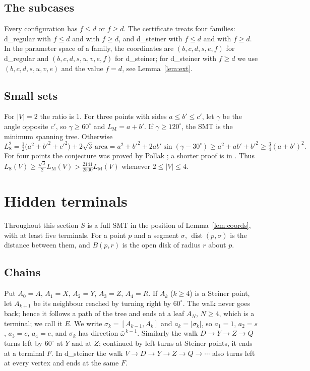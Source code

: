 \documentclass[11pt]{amsart}
\theoremstyle{definition}
\theoremstyle{remark}
\numberwithin{equation}{section}
\newcommand{\LS}{L_{\mathrm S}}
\newcommand{\LM}{L_{\mathrm M}}
\newcommand{\dist}{\operatorname{dist}}
\newcommand{\RHO}{\tfrac{2141}{2500}}
\begin{document}
\subsection{The subcases}
Every configuration has $f\le d$ or $f\ge d$. The certificate treats four families: d\_regular with $f\le d$ and with $f\ge d$, and d\_steiner with $f\le d$ and with $f\ge d$. In the parameter space of a family, the coordinates are $(b,c,d,s,e,f)$ for d\_regular and $(b,c,d,s,u,v,e,f)$ for d\_steiner; for d\_steiner with $f\ge d$ we use $(b,c,d,s,u,v,e)$ and the value $f=d$, see Lemma~\ref{lem:ext}.

\subsection{Small sets}\label{sec:small}
For $|V|=2$ the ratio is $1$. For three points with sides $a\le b'\le c'$, let $\gamma$ be the angle opposite $c'$, so $\gamma\ge60^\circ$ and $\LM=a+b'$. If $\gamma\ge120^\circ$, the SMT is the minimum spanning tree. Otherwise
\[
\LS^2=\tfrac12\bigl(a^2+b'^2+c'^2\bigr)+2\sqrt3\,\mathrm{area}=a^2+b'^2+2ab'\sin(\gamma-30^\circ)\ge a^2+ab'+b'^2\ge\tfrac34(a+b')^2.
\]
For four points the conjecture was proved by Pollak \cite{Pol78}; a shorter proof is in \cite{DYH82}. Thus $\LS(V)\ge\frac{\sqrt3}2\LM(V)>\RHO\LM(V)$ whenever $2\le|V|\le4$.

\section{Hidden terminals}\label{sec:trap}

Throughout this section $S$ is a full SMT in the position of Lemma~\ref{lem:coords}, with at least five terminals. For a point $p$ and a segment $\sigma$, $\dist(p,\sigma)$ is the distance between them, and $B(p,r)$ is the open disk of radius $r$ about $p$.

\subsection{Chains}\label{sec:chains}
Put $A_0=A$, $A_1=X$, $A_2=Y$, $A_3=Z$, $A_4=R$. If $A_k$ ($k\ge4$) is a Steiner point, let $A_{k+1}$ be its neighbour reached by turning right by $60^\circ$. The walk never goes back; hence it follows a path of the tree and ends at a leaf $A_N$, $N\ge4$, which is a terminal; we call it $E$. We write $\sigma_k=[A_{k-1},A_k]$ and $a_k=|\sigma_k|$, so $a_1=1$, $a_2=s$, $a_3=c$, $a_4=e$, and $\sigma_k$ has direction $\bar\omega^{\,k-1}$. Similarly the walk $D\to Y\to Z\to Q$ turns left by $60^\circ$ at $Y$ and at $Z$; continued by left turns at Steiner points, it ends at a terminal $F$. In d\_steiner the walk $V\to D\to Y\to Z\to Q\to\cdots$ also turns left at every vertex and ends at the same $F$.
\end{document}
